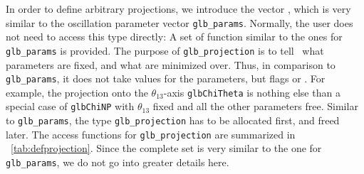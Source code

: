 In order to define arbitrary projections, we introduce the vector
, which is very similar to the
oscillation parameter vector {\tt glb\_params}.
Normally, the user does not need to access this type directly:
A set of function similar to the ones for {\tt glb\_params} is
provided. The purpose of {\tt glb\_projection} is to tell \GLOBES\ 
what parameters are fixed, and what are minimized over. Thus, in
comparison to {\tt glb\_params}, it does not take values for the
parameters, but flags \GLBC{GLB\_FIXED} or \GLBC{GLB\_FREE}.
For example, the projection onto the $\theta_{13}$-axis {\tt glbChiTheta}
is nothing else than a special case of {\tt glbChiNP} with $\theta_{13}$
fixed and all the other parameters free. Similar to {\tt glb\_params},
the type {\tt glb\_projection} has to be allocated first, and freed
later. The access functions for {\tt glb\_projection} are summarized in \Tab~\ref{tab:defprojection}. Since the complete set is very similar to
the one for {\tt glb\_params}, we do not go into greater details here.

